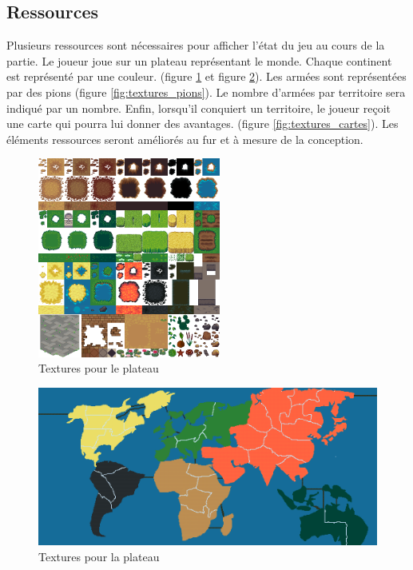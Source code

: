 \subsection{Ressources}
    Plusieurs ressources sont nécessaires pour afficher l'état du jeu au cours de la partie. 
    Le joueur joue sur un plateau représentant le monde. Chaque continent est représenté par une couleur.  (figure \ref{fig:textures_plateau} et figure \ref{fig:textures_plateau2}).  Les armées sont représentées par des pions (figure \ref{fig:textures_pions}). Le nombre d'armées par territoire sera indiqué par un nombre. Enfin, lorsqu'il conquiert un territoire, le joueur reçoit une carte qui pourra lui donner des avantages. (figure \ref{fig:textures_cartes}). Les éléments ressources seront améliorés au fur et à mesure de la conception. 
    
    \begin{figure}[!htbp]
        \centering
        \includegraphics[width=6cm]{Images/terrain.png}
        \caption{Textures pour le plateau}
        \label{fig:textures_plateau}
    \end{figure}

    
    \begin{figure}[!htbp]
        \centering
        \includegraphics[width=13cm]{Images/map_jeu.png}
        \caption{Textures pour la plateau}
        \label{fig:textures_plateau2}
    \end{figure}
    
